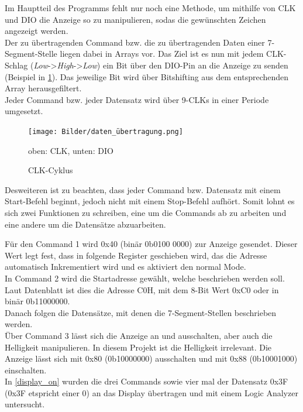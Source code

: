\documentclass[11pt,a4paper,titlepage]{article}
\begin{document}
Im Hauptteil des Programms fehlt nur noch eine Methode, um mithilfe von CLK und DIO die Anzeige so zu manipulieren,
sodas die gewünschten Zeichen angezeigt werden.\\

Der zu übertragenden Command bzw. die zu übertragenden Daten einer 7-Segment-Stelle liegen dabei in Arrays vor.
Das Ziel ist es nun mit jedem CLK-Schlag (\textit{Low}->\textit{High}->\textit{Low}) 
ein Bit über den DIO-Pin an die Anzeige zu senden (Beispiel in \cref{clk}).
Das jeweilige Bit wird über Bitshifting aus dem entsprechenden Array herausgefiltert.\\
Jeder Command bzw. jeder Datensatz wird über 9-CLKs in einer Periode umgesetzt.

\vspace{0.5cm}
\begin{figure}[h]
    \begin{center}
        \texttt{[image: Bilder/daten\_übertragung.png]}
        \caption{CLK-Cyklus}
        {\small oben: CLK, unten: DIO}
        \label{clk}
    \end{center}
\end{figure}

\newpage

Desweiteren ist zu beachten, dass jeder Command bzw. Datensatz mit einem Start-Befehl beginnt, jedoch nicht mit einem Stop-Befehl aufhört.
Somit lohnt es sich zwei Funktionen zu schreiben, eine um die Commands ab zu arbeiten und eine andere um die Datensätze abzuarbeiten.

Für den Command 1 wird 0x40 (binär 0b0100 0000) zur Anzeige gesendet.
Dieser Wert legt fest, dass in folgende Register geschieben wird, 
das die Adresse automatisch Inkrementiert wird und es aktiviert den normal Mode.\\
In Command 2 wird die Startadresse gewählt, welche beschrieben werden soll.
Laut Datenblatt ist dies die Adresse C0H, mit dem 8-Bit Wert 0xC0 oder in binär 0b11000000.\\
Danach folgen die Datensätze, mit denen die 7-Segment-Stellen beschrieben werden.\\
Über Command 3 lässt sich die Anzeige an und ausschalten, aber auch die Helligkeit manipulieren.
In diesem Projekt ist die Helligkeit irrelevant.
Die Anzeige lässt sich mit 0x80 (0b10000000) ausschalten und mit 0x88 (0b10001000) einschalten.\\


In \cref{display_on} wurden die drei Commands sowie vier mal der Datensatz 0x3F (0x3F etspricht einer 0) an das Display übertragen 
und mit einem Logic Analyzer untersucht.
\end{document}
